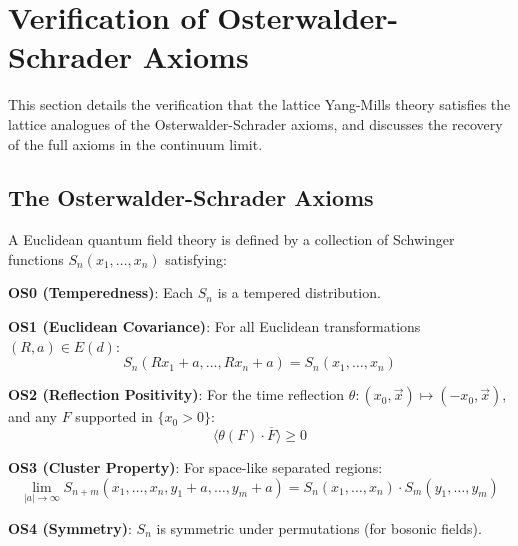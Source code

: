 \section{Verification of Osterwalder-Schrader Axioms}
\label{sec:os-axioms}
\label{sec:os-reconstruction}

This section details the verification that the lattice Yang-Mills theory satisfies the lattice analogues of the Osterwalder-Schrader axioms, and discusses the recovery of the full axioms in the continuum limit.

\subsection{The Osterwalder-Schrader Axioms}

\begin{definition}
\label{def:os-axioms}
A Euclidean quantum field theory is defined by a collection of Schwinger 
functions \(S_n(x_1, \ldots, x_n)\) satisfying:

\textbf{OS0 (Temperedness)}: Each \(S_n\) is a tempered distribution.

\textbf{OS1 (Euclidean Covariance)}: For all Euclidean transformations 
\((R, a) \in E(d)\):
\begin{equation}
S_n(Rx_1 + a, \ldots, Rx_n + a) = S_n(x_1, \ldots, x_n)
\end{equation}

\textbf{OS2 (Reflection Positivity)}: For the time reflection 
$\theta: (x_0, \vec{x}) \mapsto (-x_0, \vec{x})$, and any $F$ supported in 
$\{x_0 > 0\}$:
\begin{equation}
\langle \theta(F) \cdot \overline{F} \rangle \geq 0
\end{equation}

\textbf{OS3 (Cluster Property)}: For space-like separated regions:
\begin{equation}
\lim_{|a| \to \infty} S_{n+m}(x_1, \ldots, x_n, y_1 + a, \ldots, y_m + a) = S_n(x_1, \ldots, x_n) \cdot S_m(y_1, \ldots, y_m)
\end{equation}

\textbf{OS4 (Symmetry)}: $S_n$ is symmetric under permutations (for bosonic fields).
\end{definition}

